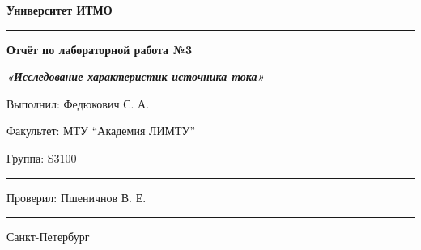 \documentclass[12pt]{article}
\begin{document}
\pagestyle{empty}
\begin{center}
\large{\textbf{Университет ИТМО}}
\end{center}
\rule{550pt}{1pt}
\par\bigskip\par\bigskip\par\bigskip\par\bigskip\par\bigskip\par\bigskip\par\bigskip\par\bigskip
\begin{center}
\Large
\textbf{Отчёт по лабораторной работа №3}

\textbf{\textit{«Исследование характеристик источника тока»}}


\end{center}
\par\bigskip\par\bigskip\par\bigskip\par\bigskip\par\bigskip\par\bigskip\par\bigskip\par\bigskip\par\bigskip\par\bigskip\par\bigskip\par\bigskip\par\bigskip\par\bigskip      
\begin{flushright}
\large
Выполнил: Федюкович  С. А.
\par\bigskip
Факультет: МТУ “Академия ЛИМТУ”
\par\bigskip
Группа: S3100                       
\par\bigskip\par\bigskip\par\bigskip

\rule{150pt}{0.5pt}
\par\bigskip\par\bigskip\par\bigskip\par\bigskip                                                            
 Проверил: Пшеничнов В. Е.
\par\bigskip \par\bigskip

\rule{150pt}{0.5pt}
\end{flushright}
\par\bigskip\par\bigskip\par\bigskip\par\bigskip\par\bigskip\par\bigskip\par\bigskip\par\bigskip\par\bigskip\par\bigskip     
\begin{center}
\large
Санкт-Петербург
\par{}
\end{center}
\newpage
\end{document}
